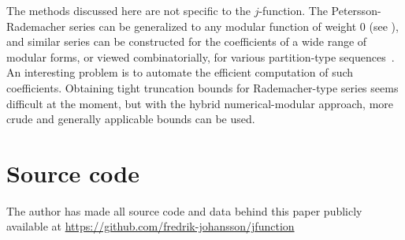 \documentclass{amsart}
\theoremstyle{definition}
\theoremstyle{remark}
\begin{document}
The methods discussed here are not specific to the $j$-function.
The Petersson-Rademacher series can be generalized to
any modular function of weight 0 (see \cite[Theorem~5.1]{Brisebarre2005}),
and similar series can be constructed
for the coefficients of a wide range of modular forms,
or viewed combinatorially,
for various partition-type sequences~\cite{sills2010towards}.
An interesting problem is to automate the efficient
computation of such coefficients.
Obtaining tight truncation bounds for Rademacher-type series
seems difficult at the moment,
but with the hybrid
numerical-modular approach, more crude and generally
applicable bounds can be used.

\section{Source code}

The author has made all source code and data behind this
paper publicly available at \url{https://github.com/fredrik-johansson/jfunction}



\end{document}
